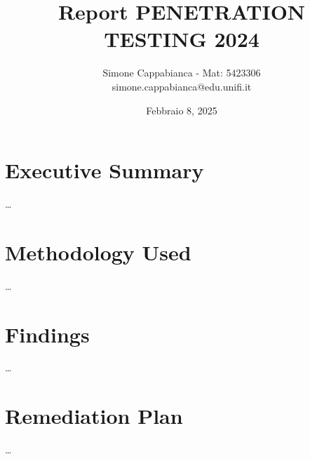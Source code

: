 \documentclass[12pt]{article}
\title{ Report PENETRATION TESTING 2024}
\author{Simone Cappabianca - Mat: 5423306 \\  simone.cappabianca@edu.unifi.it}
\date{Febbraio 8, 2025}
\begin{document}
\maketitle
\newpage

\tableofcontents
\newpage

\section{Executive Summary}
\dots

\section{Methodology Used}
\dots

\section{Findings}
\dots

\section{Remediation Plan}
\dots
\end{document}
